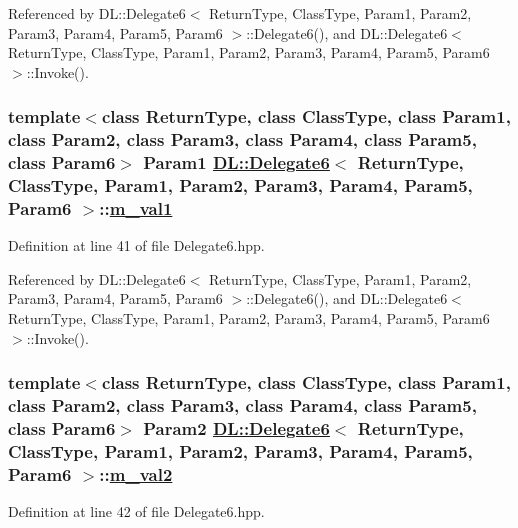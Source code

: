 Referenced by DL::Delegate6$<$ Return\-Type, Class\-Type, Param1, Param2, Param3, Param4, Param5, Param6 $>$::Delegate6(), and DL::Delegate6$<$ Return\-Type, Class\-Type, Param1, Param2, Param3, Param4, Param5, Param6 $>$::Invoke().\hypertarget{classDL_1_1Delegate6_r2}{
\subsubsection[m\_\-val1]{\setlength{\rightskip}{0pt plus 5cm}template$<$class Return\-Type, class Class\-Type, class Param1, class Param2, class Param3, class Param4, class Param5, class Param6$>$ Param1 \hyperlink{classDL_1_1Delegate6}{DL::Delegate6}$<$ Return\-Type, Class\-Type, Param1, Param2, Param3, Param4, Param5, Param6 $>$::\hyperlink{classDL_1_1Delegate6_r2}{m\_\-val1}}}
\label{classDL_1_1Delegate6_r2}




Definition at line 41 of file Delegate6.hpp.

Referenced by DL::Delegate6$<$ Return\-Type, Class\-Type, Param1, Param2, Param3, Param4, Param5, Param6 $>$::Delegate6(), and DL::Delegate6$<$ Return\-Type, Class\-Type, Param1, Param2, Param3, Param4, Param5, Param6 $>$::Invoke().\hypertarget{classDL_1_1Delegate6_r3}{
\subsubsection[m\_\-val2]{\setlength{\rightskip}{0pt plus 5cm}template$<$class Return\-Type, class Class\-Type, class Param1, class Param2, class Param3, class Param4, class Param5, class Param6$>$ Param2 \hyperlink{classDL_1_1Delegate6}{DL::Delegate6}$<$ Return\-Type, Class\-Type, Param1, Param2, Param3, Param4, Param5, Param6 $>$::\hyperlink{classDL_1_1Delegate6_r3}{m\_\-val2}}}
\label{classDL_1_1Delegate6_r3}




Definition at line 42 of file Delegate6.hpp.

